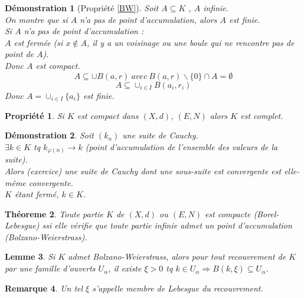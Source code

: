 \documentclass[a4paper, oneside]{report}
\theoremstyle{break}
\newtheorem{thm}{Théoreme}[section] %
\newtheorem{propr}[thm]{Propriété}
\newtheorem{lemme}[thm]{Lemme}
\newtheorem*{demo}{Démonstration}
\newtheorem{remar}[thm]{Remarque}
\begin{document}
\begin{demo}[Propriété \ref{BW}]
Soit $A\subseteq K$ , $A$ infinie.\\
On montre que si $A$ n'a pas de point d'accumulation, alors $A$ est finie.\\
Si $A$ n'a pas de point d'accumulation :\\
$A$ est fermée (si $x\notin A$, il y a un voisinage ou une boule qui ne rencontre pas de point de $A$).\\
Donc $A$ est compact.
$$A\subseteq \cup B(a,r)~avec~B(a,r)\backslash \{0\} \cap A = \emptyset$$
$$A\subseteq \cup_{i\in I} B(a_i,r_i)$$
Donc $A=\cup_{i\in I}\{a_i\}$ est finie.
\end{demo}


\begin{propr}

Si $K$ est compact dans $(X,d)$, $(E,N)$ alors $K$ est complet.
\end{propr}

\begin{demo}
Soit $(k_n)$ une suite de Cauchy.\\
$\exists k\in K$ tq $k_{\varphi(n)} \rightarrow k$ (point d'accumulation de l'ensemble des valeurs de la suite).\\
Alors (exercice) une suite de Cauchy dont une sous-suite est convergente est elle-même convergente.\\
$K$ étant fermé, $k\in K$.
\end{demo}


\begin{thm}
\label{thm_1}
Toute partie $K$ de $(X,d)$ ou $(E,N)$ est compacte (Borel-Lebesgue) ssi elle vérifie que toute partie infinie admet un point d'accumulation (Bolzano-Weierstrass).
\end{thm}

\begin{lemme}
\label{lemme_1}
Si $K$ admet Bolzano-Weierstrass, alors pour tout recouvrement de $K$ par une famille d'ouverts $U_\alpha$, il existe $\xi > 0$ tq $k\in U_\alpha \Rightarrow B(k,\xi) \subseteq U_\alpha$.
\end{lemme}


\begin{remar}
Un tel $\xi$ s'appelle membre de Lebesgue du recouvrement.
\end{remar}
\end{document}
